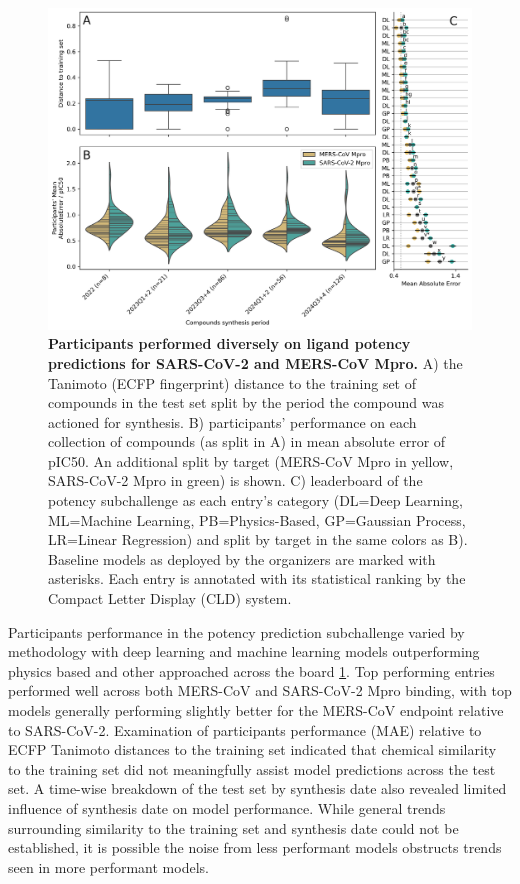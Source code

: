 \documentclass[journal=jcim,manuscript=article]{achemso}
\begin{document}
\begin{figure}
    \includegraphics[scale=0.6]{04_figs_leaderboards/potency_leaderboards_and_progressions.png}
  \caption{\textbf{Participants performed diversely on ligand potency predictions for SARS-CoV-2 and MERS-CoV Mpro.} A) the Tanimoto (ECFP fingerprint) distance to the training set of compounds in the test set split by the period the compound was actioned for synthesis. B) participants' performance on each collection of compounds (as split in A) in mean absolute error of pIC50. An additional split by target (MERS-CoV Mpro in yellow, SARS-CoV-2 Mpro in green) is shown. C) leaderboard of the potency subchallenge as each entry's category (DL=Deep Learning, ML=Machine Learning, PB=Physics-Based, GP=Gaussian Process, LR=Linear Regression) and split by target in the same colors as B). Baseline models as deployed by the organizers are marked with asterisks. Each entry is annotated with its statistical ranking by the Compact Letter Display (CLD) system\cite{cld_algorithm_2004}.}
  \label{fgr:potency_leaderboards}
\end{figure}

Participants performance in the potency prediction subchallenge varied by methodology with deep learning and machine learning models outperforming physics based and other approached across the board \ref{fgr:potency_leaderboards}. Top performing entries performed well across both MERS-CoV and SARS-CoV-2 Mpro binding, with top models generally performing slightly better for the MERS-CoV endpoint relative to SARS-CoV-2. Examination of participants performance (MAE) relative to ECFP Tanimoto distances to the training set indicated that chemical similarity to the training set did not meaningfully assist model predictions across the test set. A time-wise breakdown of the test set by synthesis date also revealed limited influence of synthesis date on model performance. While general trends surrounding similarity to the training set and synthesis date could not be established, it is possible the noise from less performant models obstructs trends seen in more performant models.
\end{document}
